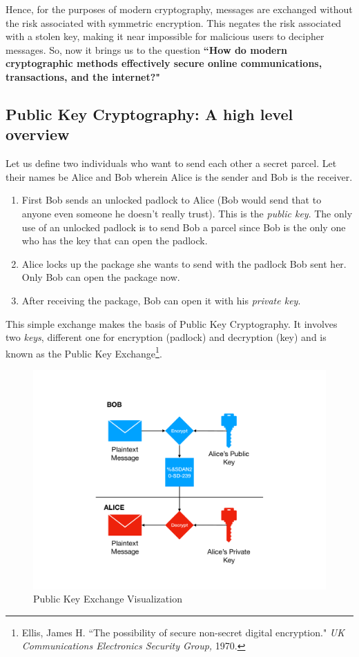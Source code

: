 \documentclass[a4paper,12pt]{article}
\theoremstyle{definition}
\begin{document}
Hence, for the purposes of modern cryptography, messages are exchanged without the risk associated with symmetric encryption. This negates the risk associated with a stolen key, making it near impossible for malicious users to decipher messages. So, now it brings us to the question \textbf{``How do modern cryptographic methods effectively secure online communications, transactions, and the internet?"}

\subsection{Public Key Cryptography: A high level overview} \label{publickeyexchange}

Let us define two individuals who want to send each other a secret parcel. Let their names be Alice and Bob wherein Alice is the sender and Bob is the receiver.
\begin{enumerate}
	\item First Bob sends an unlocked padlock to Alice (Bob would send that to anyone even someone he doesn't really trust). This is the \textit{public key}. The only use of an unlocked padlock is to send Bob a parcel since Bob is the only one who has the key that can open the padlock.
	\item Alice locks up the package she wants to send with the padlock Bob sent her. Only Bob can open the package now.
	\item After receiving the package, Bob can open it with his \textit{private key}.
\end{enumerate}

This simple exchange makes the basis of Public Key Cryptography. It involves two \textit{keys}, different one for encryption (padlock) and decryption (key) and is known as the Public Key Exchange\footnote{Ellis, James H. ``The possibility of secure non-secret digital encryption." \textit{UK Communications Electronics Security Group,} 1970.}.
\begin{figure}[h]
	\includegraphics[width=\textwidth]{bobalice}
	\centering
	\caption{Public Key Exchange Visualization}
\end{figure}
\end{document}
